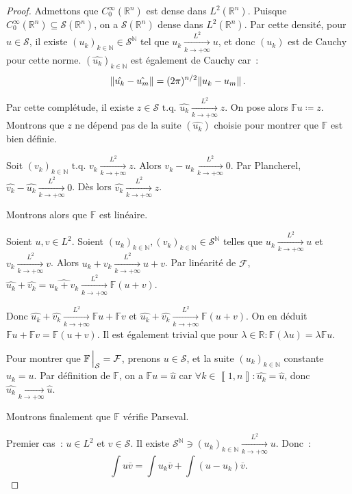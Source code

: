 \documentclass{report}
\newcommand{\R}{{\mathbb R}}
\newcommand{\N}{{\mathbb N}}
\newcommand{\tq}{\text{ t.q. }}
\newcommand{\pinfty}{{+\infty}}
\newcommand{\intint}[2]{{\left\llbracket#1, #2\right\rrbracket}}
\theoremstyle{definition}
\theoremstyle{remark}
\begin{document}
\begin{proof} Admettons que $C_0^\infty(\R^n)$ est dense dans $L^2(\R^n)$. Puisque $C_0^\infty(\R^n) \subseteq \mathcal S(\R^n)$, on a $\mathcal S(\R^n)$ dense dans $L^2(\R^n)$.
Par cette densité, pour $u \in \mathcal S$, il existe $(u_k)_{k \in \N} \in \mathcal S^\N$ tel que $u_k \xrightarrow[k \to \pinfty]{L^2} u$, et donc $(u_k)$ est de Cauchy
pour cette norme. $(\hat {u_k})_{k \in \N}$ est également de Cauchy car~:
\[\norm {\hat {u_k} - \hat {u_m}} = (2\pi)^{n/2}\norm {u_k - u_m}.\]

Par cette complétude, il existe $z \in \mathcal S \tq \hat {u_k} \xrightarrow[k \to \pinfty]{L^2} z$. On pose alors $\mathbb Fu \coloneqq z$. Montrons que $z$ ne dépend pas
de la suite $(\hat {u_k})$ choisie pour montrer que $\mathbb F$ est bien définie.

Soit $(v_k)_{k \in \N} \tq v_k \xrightarrow[k \to \pinfty]{L^2} z$. Alors $v_k-u_k \xrightarrow[k \to \pinfty]{L^2} 0$. Par Plancherel,
$\hat {v_k}-\hat {u_k} \xrightarrow[k \to \pinfty]{L^2} 0$. Dès lors $\hat {v_k} \xrightarrow[k \to \pinfty]{L^2} z$.

Montrons alors que $\mathbb F$ est linéaire.

Soient $u, v \in L^2$. Soient $(u_k)_{k \in \N}, (v_k)_{k \in \N} \in \mathcal S^\N$ telles que $u_k \xrightarrow[k \to \pinfty]{L^2} u$ et $v_k \xrightarrow[k \to \pinfty]{L^2} v$.
Alors $u_k+v_k \xrightarrow[k \to \pinfty]{L^2} u+v$. Par linéarité de $\mathcal F$, $\hat {u_k} + \hat {v_k} = \widehat {u_k + v_k} \xrightarrow[k \to \pinfty]{L^2} \mathbb F(u+v)$.

Donc $\hat {u_k} + \hat {v_k} \xrightarrow[k \to \pinfty]{L^2} \mathbb Fu + \mathbb Fv$ et $\hat {u_k} + \hat {v_k} \xrightarrow[k \to \pinfty]{L^2} \mathbb F(u+v)$.
On en déduit $\mathbb F u + \mathbb F v = \mathbb F(u+v)$. Il est également trivial que pour $\lambda \in \R : \mathbb F(\lambda u) = \lambda \mathbb Fu$.

Pour montrer que $\mathbb F\sVert[2]_{\mathcal S} = \mathcal F$, prenons $u \in \mathcal S$, et la suite $(u_k)_{k \in \N}$ constante $u_k = u$. Par définition de $\mathbb F$,
on a $\mathbb Fu = \hat u$ car $\forall k \in \intint 1n : \hat {u_k} = \hat u$, donc $\hat {u_k} \xrightarrow[k \to \pinfty]{} \hat u$.

Montrons finalement que $\mathbb F$  vérifie Parseval.

Premier cas~: $u \in L^2$ et $v \in \mathcal S$. Il existe $\mathcal S^\N \ni (u_k)_{k \in \N} \xrightarrow[k \to \pinfty]{L^2} u$. Donc~:
\[\int u\overline v = \int u_k\overline v + \int (u-u_k)\overline v.\]


\end{proof}
\end{document}
